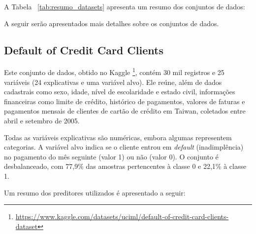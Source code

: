 A Tabela ~\ref{tab:resumo_datasets} apresenta um resumo dos conjuntos de dados:


\begin{table}[H]
	\centering
	\caption{Resumo dos conjuntos de dados utilizados no experimento}
	\label{tab:resumo_datasets}
\end{table}


A seguir serão apresentados mais detalhes sobre os conjuntos de dados.

\subsection{Default of Credit Card Clients}

Este conjunto de dados, obtido no Kaggle \footnote{\url{https://www.kaggle.com/datasets/uciml/default-of-credit-card-clients-dataset}}, contém 30 mil registros e 25 variáveis (24 explicativas e uma variável alvo). Ele reúne, além de dados cadastrais como sexo, idade, nível de escolaridade e estado civil, informações financeiras como limite de crédito, histórico de pagamentos, valores de faturas e pagamentos mensais de clientes de cartão de crédito em Taiwan, coletados entre abril e setembro de 2005.

Todas as variáveis explicativas são numéricas, embora algumas representem categorias. A variável alvo indica se o cliente entrou em \textit{default} (inadimplência) no pagamento do mês seguinte (valor 1) ou não (valor 0). O conjunto é desbalanceado, com 77,9\% das amostras pertencentes à classe 0 e 22,1\% à classe 1.

Um resumo dos preditores utilizados é apresentado a seguir:

